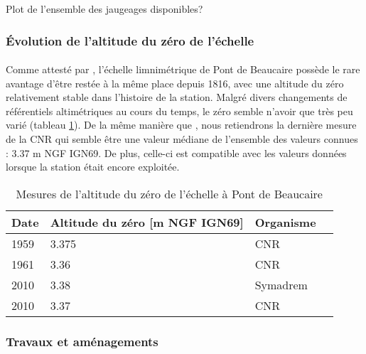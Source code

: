\documentclass[11pt]{article}
\begin{document}
    Plot de l'ensemble des jaugeages disponibles?
	
	\subsubsection{Évolution de l'altitude du zéro de l'échelle}
    
    \paragraph{} Comme attesté par \citet{pichard_hauteurs_2013}, l'échelle limnimétrique de Pont de Beaucaire possède le rare avantage d'être restée à la même place depuis 1816, avec une altitude du zéro relativement stable dans l'histoire de la station. Malgré divers changements de référentiels altimétriques au cours du temps, le zéro semble n'avoir que très peu varié (tableau \ref{tab:zeroPt}). De la même manière que \citet{bard_actualisation_2018}, nous retiendrons la dernière mesure de la CNR qui semble être une valeur médiane de l'ensemble des valeurs connues : 3.37 m NGF IGN69. De plus, celle-ci est compatible avec les valeurs données lorsque la station était encore exploitée.

            \begin{table}[h]
                \centering
                \caption{Mesures de l'altitude du zéro de l'échelle à Pont de Beaucaire}
            	\label{tab:zeroPt}
                \begin{tabular}{| m{1.5cm} | m{3cm}| m{3cm} | m{2cm} |} 
                    \hline
                    Date & Altitude du zéro [m NGF IGN69] & Organisme \\
                    \hline
                    1959 &	3.375 &	CNR\\
                    \hline
                    1961 &	3.36 &	CNR\\
                    \hline
                    2010 &	3.38 &	Symadrem\\
                    \hline
                    2010 &	3.37 &	CNR\\
                    \hline
            \end{tabular}
        \end{table}


\FloatBarrier
		\subsubsection{Travaux et aménagements}
    	\label{subsubsec:TravauxPt}
    
\end{document}
